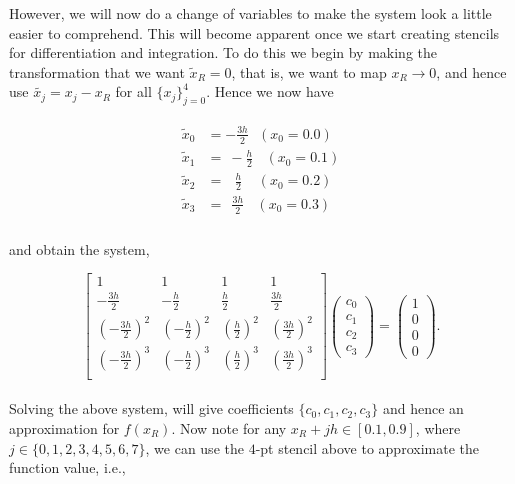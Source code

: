 \documentclass[paper=a4, fontsize=11pt]{scrartcl} %
\numberwithin{equation}{section} %
\numberwithin{figure}{section} %
\numberwithin{table}{section} %
\begin{document}
 However, we will now do a change of variables to make the system look a little easier to comprehend. This will become apparent once we start creating stencils for differentiation and integration. To do this we begin by making the transformation that we want $\tilde{x}_R = 0$, that is, we want to map $x_R \rightarrow 0$, and hence use $\tilde{x_j} = x_j - x_R$ for all $\{x_{j}\}_{j=0}^{4}$. Hence we now have
 
 \begin{align}
 \nonumber
 \begin{split}
 \tilde{x}_0 &= -\frac{3h}{2} \ \ \ (x_0 = 0.0) \\ 
 \tilde{x}_1 &= \ -\frac{h}{2} \ \ \ \ (x_0 = 0.1) \\ 
 \tilde{x}_2 &=\ \ \ \frac{h}{2} \ \ \ \ \ (x_0 = 0.2) \\ 
 \tilde{x}_3 &= \ \ \frac{3h}{2} \ \ \ \ (x_0 = 0.3) \\ 
 \end{split}
 \end{align}
  
and obtain the system,

$$\left[ \begin{array}{cccc}
1                           &                 1                   &             1                 &                 1              \\
-\frac{3h}{2}         &        -\frac{h}{2}            &     \frac{h}{2}         &       \frac{3h}{2}        \\
(-\frac{3h}{2})^2  &        (-\frac{h}{2})^2     &     (\frac{h}{2})^2    &       (\frac{3h}{2})^2  \\
(-\frac{3h}{2})^3  &        (-\frac{h}{2})^3     &     (\frac{h}{2})^3    &       (\frac{3h}{2})^3  \\
\end{array} \right] %
%
\left( \begin{array}{c}
c_{0} \\
c_{1} \\
c_2 \\
c_3 
\end{array} \right) =  
%
\left( \begin{array}{c}
1 \\
0 \\
0 \\
0
\end{array} \right).$$\\
%

Solving the above system, will give coefficients $\{c_0, c_1, c_2, c_3\}$ and hence an approximation for $f(x_R)$. Now note for any $x_R + jh \in[0.1,0.9]$, where $j\in\{0,1,2,3,4,5,6,7\}$, we can use the $4$-pt stencil above to approximate the function value, i.e.,
\end{document}
